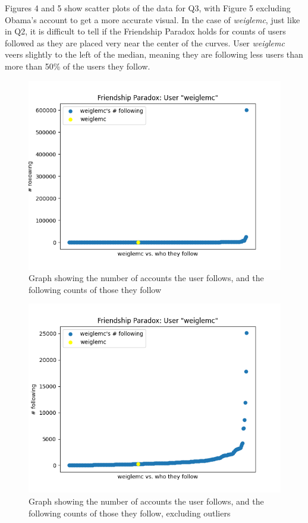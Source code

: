 \documentclass[12pt]{article}
\begin{document}
Figures 4 and 5 show scatter plots of the data for Q3, with Figure 5 excluding Obama's account to get a more accurate visual. In the case of \emph{weiglemc}, just like in Q2, it is difficult to tell if the Friendship Paradox holds for counts of users followed as they are placed very near the center of the curves. User \emph{weiglemc} veers slightly to the left of the median, meaning they are following less users than more than 50\% of the users they follow.

\begin{figure}
    \centering
    \includegraphics{FollowingCounts.png}
    \caption{Graph showing the number of accounts the user follows, and the following counts of those they follow}
    \label{fig:my_label}
\end{figure}

\begin{figure}
    \centering
    \includegraphics{FollowingCountsTrimmed.png}
    \caption{Graph showing the number of accounts the user follows, and the following counts of those they follow, excluding outliers}
    \label{fig:my_label}
\end{figure}
\end{document}
